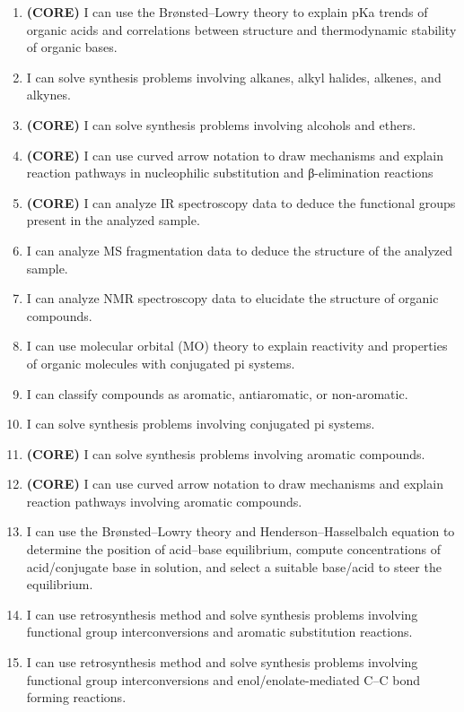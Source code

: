 \begin{enumerate}
\def\labelenumi{\arabic{enumi}.}
\tightlist
\item
  \textbf{(CORE)} I can use the Brønsted--Lowry theory to explain pKa
  trends of organic acids and correlations between structure and
  thermodynamic stability of organic bases.
\item
  I can solve synthesis problems involving alkanes, alkyl halides,
  alkenes, and alkynes.
\item
  \textbf{(CORE)} I can solve synthesis problems involving alcohols and
  ethers.
\item
  \textbf{(CORE)} I can use curved arrow notation to draw mechanisms and
  explain reaction pathways in nucleophilic substitution and
  β-elimination reactions
\item
  \textbf{(CORE)} I can analyze IR spectroscopy data to deduce the
  functional groups present in the analyzed sample.
\item
  I can analyze MS fragmentation data to deduce the structure of the
  analyzed sample.
\item
  I can analyze NMR spectroscopy data to elucidate the structure of
  organic compounds.
\item
  I can use molecular orbital (MO) theory to explain reactivity and
  properties of organic molecules with conjugated pi systems.
\item
  I can classify compounds as aromatic, antiaromatic, or non-aromatic.
\item
  I can solve synthesis problems involving conjugated pi systems.
\item
  \textbf{(CORE)} I can solve synthesis problems involving aromatic
  compounds.
\item
  \textbf{(CORE)} I can use curved arrow notation to draw mechanisms and
  explain reaction pathways involving aromatic compounds.
\item
  I can use the Brønsted--Lowry theory and Henderson--Hasselbalch
  equation to determine the position of acid--base equilibrium, compute
  concentrations of acid/conjugate base in solution, and select a
  suitable base/acid to steer the equilibrium.
\item
  I can use retrosynthesis method and solve synthesis problems involving
  functional group interconversions and aromatic substitution reactions.
\item
  I can use retrosynthesis method and solve synthesis problems involving
  functional group interconversions and enol/enolate-mediated C--C bond
  forming reactions.
\end{enumerate}

